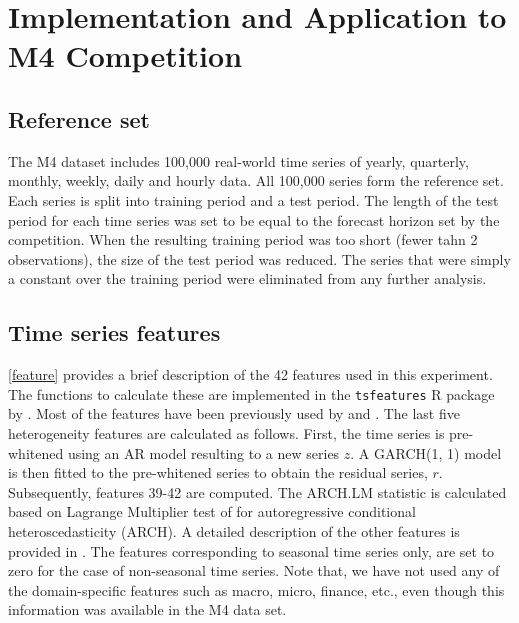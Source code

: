 \documentclass[11pt,a4paper,]{article}
\theoremstyle{definition}
\theoremstyle{definition}
\theoremstyle{definition}
\theoremstyle{remark}
\begin{document}
\begin{algorithm}[!ht]
\end{algorithm}

\clearpage

\section{Implementation and Application to M4
Competition}\label{M4application}

\subsection{Reference set}\label{reference-set}

The M4 dataset includes 100,000 real-world time series of yearly,
quarterly, monthly, weekly, daily and hourly data. All 100,000 series
form the reference set. Each series is split into training period and a
test period. The length of the test period for each time series was set
to be equal to the forecast horizon set by the competition. When the
resulting training period was too short (fewer tahn 2 observations), the
size of the test period was reduced. The series that were simply a
constant over the training period were eliminated from any further
analysis.

\subsection{Time series features}\label{time-series-features}

\autoref{feature} provides a brief description of the 42 features used
in this experiment. The functions to calculate these are implemented in
the \texttt{tsfeatures} R package by \textcite{tsfeatures}. Most of the
features have been previously used by \textcite{hyndman2015large} and
\textcite{fforms}. The last five heterogeneity features are calculated
as follows. First, the time series is pre-whitened using an AR model
resulting to a new series \(z\). A GARCH(1, 1) model is then fitted to
the pre-whitened series to obtain the residual series, \(r\).
Subsequently, features 39-42 are computed. The ARCH.LM statistic is
calculated based on Lagrange Multiplier test of
\textcite{engle1982autoregressive} for autoregressive conditional
heteroscedasticity (ARCH). A detailed description of the other features
is provided in \textcite{fforms}. The features corresponding to seasonal
time series only, are set to zero for the case of non-seasonal time
series. Note that, we have not used any of the domain-specific features
such as macro, micro, finance, etc., even though this information was
available in the M4 data
set.
\end{document}
